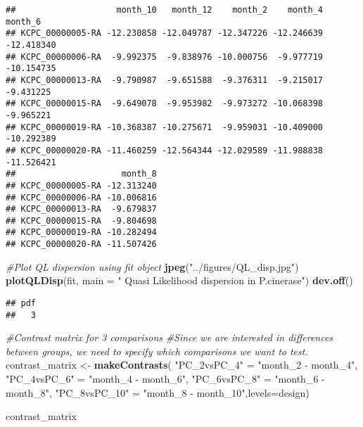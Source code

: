 \documentclass[]{article}
\newenvironment{Shaded}{\begin{snugshade}}{\end{snugshade}}
\newcommand{\CommentTok}[1]{\textcolor[rgb]{0.56,0.35,0.01}{\textit{#1}}}
\newcommand{\DataTypeTok}[1]{\textcolor[rgb]{0.13,0.29,0.53}{#1}}
\newcommand{\KeywordTok}[1]{\textcolor[rgb]{0.13,0.29,0.53}{\textbf{#1}}}
\newcommand{\NormalTok}[1]{#1}
\newcommand{\StringTok}[1]{\textcolor[rgb]{0.31,0.60,0.02}{#1}}
\begin{document}
\begin{verbatim}
##                    month_10   month_12    month_2    month_4    month_6
## KCPC_00000005-RA -12.230858 -12.049787 -12.347226 -12.246639 -12.418340
## KCPC_00000006-RA  -9.992375  -9.838976 -10.000756  -9.977719 -10.154735
## KCPC_00000013-RA  -9.790987  -9.651588  -9.376311  -9.215017  -9.431225
## KCPC_00000015-RA  -9.649078  -9.953982  -9.973272 -10.068398  -9.965221
## KCPC_00000019-RA -10.368387 -10.275671  -9.959031 -10.409000 -10.292389
## KCPC_00000020-RA -11.460259 -12.564344 -12.029589 -11.988838 -11.526421
##                     month_8
## KCPC_00000005-RA -12.313240
## KCPC_00000006-RA -10.006816
## KCPC_00000013-RA  -9.679837
## KCPC_00000015-RA  -9.804698
## KCPC_00000019-RA -10.282494
## KCPC_00000020-RA -11.507426
\end{verbatim}

\begin{Shaded}
\begin{Highlighting}[]
\CommentTok{#Plot QL dispersion  using fit object}
\KeywordTok{jpeg}\NormalTok{(}\StringTok{"../figures/QL_disp.jpg"}\NormalTok{)}
\KeywordTok{plotQLDisp}\NormalTok{(fit, }\DataTypeTok{main =} \StringTok{" Quasi Likelihood dispersion in P.cinerase"}\NormalTok{)}
\KeywordTok{dev.off}\NormalTok{()}
\end{Highlighting}
\end{Shaded}

\begin{verbatim}
## pdf 
##   3
\end{verbatim}

\begin{Shaded}
\begin{Highlighting}[]
\CommentTok{#Contrast matrix for 3 comparisons }
\CommentTok{#Since we are interested in differences between groups, we need to specify which comparisons we want to test.}
\NormalTok{contrast_matrix <-}\StringTok{ }\KeywordTok{makeContrasts}\NormalTok{(}
  \StringTok{"PC_2vsPC_4"}\NormalTok{ =}\StringTok{ "month_2 - month_4"}\NormalTok{,}
  \StringTok{"PC_4vsPC_6"}\NormalTok{ =}\StringTok{ "month_4 - month_6"}\NormalTok{, }
  \StringTok{"PC_6vsPC_8"}\NormalTok{ =}\StringTok{ "month_6 - month_8"}\NormalTok{,}
  \StringTok{"PC_8vsPC_10"}\NormalTok{ =}\StringTok{ "month_8 - month_10"}\NormalTok{,}\DataTypeTok{levels=}\NormalTok{design)}


\NormalTok{contrast_matrix}
\end{Highlighting}
\end{Shaded}
\end{document}
